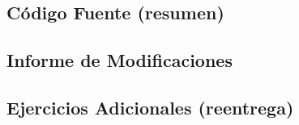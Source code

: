 \documentclass[11pt, a4paper, twoside]{article}
\begin{document}
\begin{TP1}
	\subsection{Código Fuente (resumen)}
	
	\clearpage
	
  \subsection{Informe de Modificaciones}
	
	\clearpage
  
  \subsection{Ejercicios Adicionales (reentrega)}
	
	\clearpage
	
%	


\end{TP1}
\end{document}
